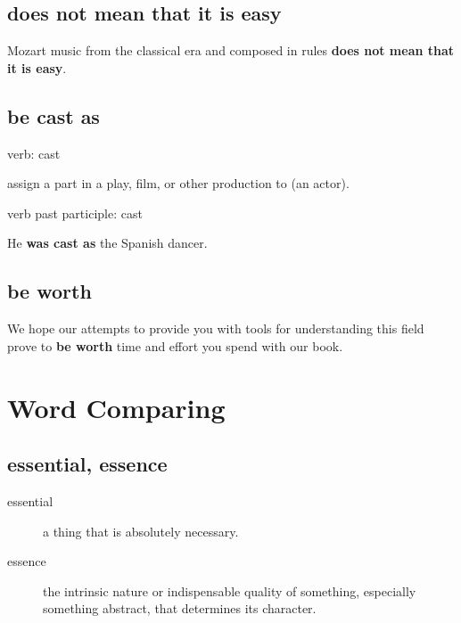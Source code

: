 \documentclass[12pt, letterpaper, onecolumn, final]{report}
\begin{document}
\section{does not mean that it is easy}
Mozart music from the classical era and composed in rules \textbf{does not mean that it is easy}.

\section{be cast as}

verb: cast

assign a part in a play, film, or other production to (an actor).

verb past participle: cast

He \textbf{was cast as} the Spanish dancer.

\section{be worth}
We hope our attempts to provide you with tools for understanding this field prove to \textbf{be worth} time and effort you spend with our book.

\chapter{Word Comparing}
\section{essential, essence}
\begin{description}
	\item[essential] a thing that is absolutely necessary.
	\item[essence] the intrinsic nature or indispensable quality of something, especially something abstract, that determines its character.
\end{description}
\end{document}
